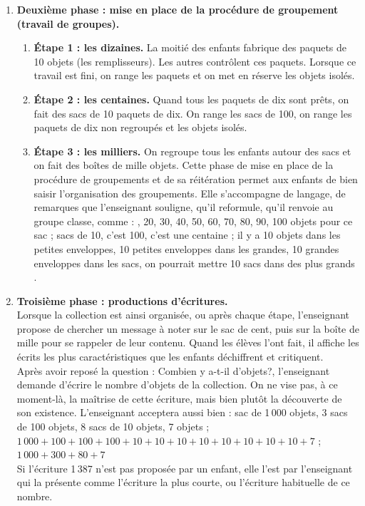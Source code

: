 \begin{exercice*}
\begin{enumerate}
   \item {\bf Deuxième phase : mise en place de la procédure de groupement (travail de groupes).}
   \begin{enumerate}
      \item {\bf Étape 1 : les dizaines.} La moitié des enfants fabrique des paquets de 10 objets (les remplisseurs). Les autres contrôlent ces paquets. Lorsque ce travail est fini, on range les paquets et on met en réserve les objets isolés.
      \item {\bf Étape 2 : les centaines.} Quand tous les paquets de dix sont prêts, on fait des sacs de 10 paquets de dix. On range les sacs de 100, on range les paquets de dix non regroupés et les objets isolés.
      \item{\bf Étape 3 : les milliers.} On regroupe tous les enfants autour des sacs et on fait des boîtes de mille objets. Cette phase de mise en place de la procédure de groupements et de sa réitération permet aux enfants de bien saisir l'organisation des groupements. Elle s'accompagne de langage, de remarques que l'enseignant souligne, qu'il reformule, qu'il renvoie au groupe classe, comme : , 20, 30, 40, 50, 60, 70, 80, 90, 100 objets pour ce sac \fg ;  sacs de 10, c'est 100, c'est une centaine\fg{} ; \og il y a 10 objets dans les petites enveloppes, 10 petites enveloppes dans les grandes, 10 grandes enveloppes dans les sacs, on pourrait mettre 10 sacs dans des plus grands \fg. \medskip
   \end{enumerate}

   \item {\bf Troisième phase : productions d'écritures.} \\
   Lorsque la collection est ainsi organisée, ou après chaque étape, l'enseignant propose de chercher un message à noter sur le sac de cent, puis sur la boîte de mille pour se rappeler de leur contenu. Quand les élèves l'ont fait, il affiche les écrits les plus caractéristiques que les enfants déchiffrent et critiquent. \\
   Après avoir reposé la question : \og Combien y a-t-il d'objets?\fg{}, l'enseignant demande d'écrire le nombre d'objets de la collection. On ne vise pas, à ce moment-là, la maîtrise de cette écriture, mais bien plutôt la découverte de son existence. L'enseignant acceptera aussi bien :  sac de 1\,000 objets, 3 sacs de 100 objets, 8 sacs de 10 objets, 7 objets \fg ; \og $1\,000 + 100 + 100 + 100 + 10 + 10 + 1 0 + 1 0 + 1 0 + 1 0 + 10 + 1 0 + 7$ \fg ; \og $1\,000 + 300 + 80 + 7$ \fg \\
   Si l'écriture 1\,387 n'est pas proposée par un enfant, elle l'est par l'enseignant qui la présente comme l'écriture \og la plus courte\fg{}, ou l'écriture \og habituelle\fg{} de ce nombre. \medskip


\end{enumerate}
\end{exercice*}
